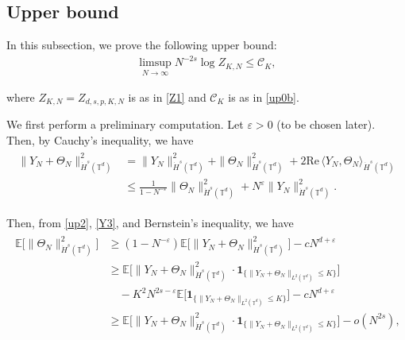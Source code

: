 \documentclass[letterpaper, 11pt,  reqno]{amsart}
\newcommand{\noi}{\noindent}
\newcommand{\T}{\mathbb{T}}
\newcommand{\E}{\mathbb{E}}
\newcommand{\eps}{\varepsilon}
\newcommand{\jb}[1]
{\langle #1 \rangle}
\newcommand{\ind}{\mathbf 1}
\numberwithin{equation}{section}
\numberwithin{theorem}{section}
\newcommand{\CC}{\mathcal{C}}
\newcommand{\Dr}{\Theta}
\begin{document}
\subsection{Upper bound}
\label{SUBSEC:3.1}


In this subsection, we prove the following upper bound:
\begin{align}
\limsup_{N\to \infty}N^{-2s} \log Z_{K, N}\le \CC_K, 
\label{up0}
\end{align}

\noi
where
$Z_{K, N} = Z_{d, s, p, K, N}$
is as in \eqref{Z1} 
and $\CC_K$ is as in \eqref{up0b}.





We first perform a preliminary computation.
Let $\eps >0$ (to be chosen later).
Then,
by Cauchy's inequality, we have 
\begin{align}
\label{up2}
\begin{split}
\|Y_N+\Dr_N\|^2_{\dot H^{s}(\T^d)}
&=\|Y_N\|^2_{\dot H^{s}(\T^d)}+\|\Dr_N\|^2_{\dot H^{s}(\T^d)}+2\text{Re}\,
\jb{Y_N,\Dr_N}_{\dot H^{s}(\T^d)}\\
& \le \frac{1}{1-N^{-\eps}} \|\Dr_N\|^2_{\dot H^{s}(\T^d)}
+N^\eps \|Y_N\|^2_{\dot H^{s}(\T^d)}.
\end{split}
\end{align}


\noi
Then, from 
\eqref{up2}, 
\eqref{Y3}, and 
Bernstein's inequality, 
we have 
\begin{align}
\begin{split}
\E\big[\|\Dr_N\|^2_{\dot H^{s}(\T^d)}\big]
&\ge (1-N^{-\eps}) \E\big[\|Y_N+\Dr_N\|^2_{\dot H^{s}(\T^d)}\big]-cN^{d+\eps}\\
& \ge 
\E\big[
\|Y_N+\Dr_N\|^2_{\dot H^{s}(\T^d)} \cdot \ind_{\{\|Y_N+\Dr_N\|_{L^{2}(\T^d)}\le K\}}\big]\\
& \quad -K^{2}N^{2s-\eps}
\E\big[ \ind_{\{\|Y_N+\Dr_N\|_{L^{2}(\T^d)}\le K\}}\big]-cN^{d+\eps}\\
& \ge 
\E\big[
 \|Y_N+\Dr_N\|^2_{\dot H^{s}(\T^d)} \cdot \ind_{\{\|Y_N+\Dr_N\|_{L^{2}(\T^d)}\le K\}}
\big]
- o(N^{2s}), 
\end{split}
\label{up3}
\end{align}
\end{document}
